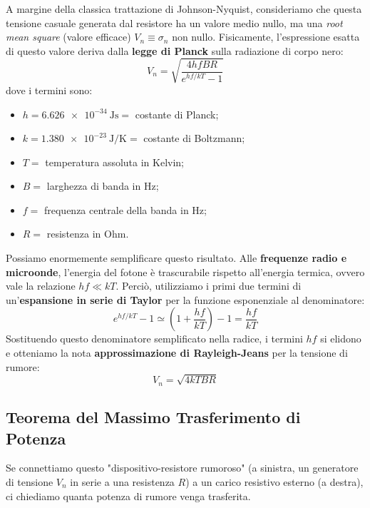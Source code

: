 \documentclass[openany,a4paper,12pt]{book}
\begin{document}
A margine della classica trattazione di Johnson-Nyquist, consideriamo che questa tensione casuale generata dal resistore ha un valore medio nullo, ma una \textit{root mean square} (valore efficace) $V_n \equiv \sigma_n$ non nullo. 
Fisicamente, l'espressione esatta di questo valore deriva dalla \textbf{legge di Planck} sulla radiazione di corpo nero:
\begin{equation}
    V_n = \sqrt{\frac{4hf BR}{e^{hf/kT} - 1}}
\end{equation}
dove i termini sono:
\begin{itemize}[label=\textcolor{PoliBlue}{\textbullet}]
    \item $h = \qty{6.626e-34}{\joule\second} =$ costante di Planck;
    \item $k = \qty{1.380e-23}{\joule\per\kelvin} =$ costante di Boltzmann;
    \item $T =$ temperatura assoluta in Kelvin;
    \item $B =$ larghezza di banda in Hz;
    \item $f =$ frequenza centrale della banda in Hz;
    \item $R =$ resistenza in Ohm.
\end{itemize}

Possiamo enormemente semplificare questo risultato. Alle \textbf{frequenze radio e microonde}, l'energia del fotone è trascurabile rispetto all'energia termica, ovvero vale la relazione $hf \ll kT$.
Perciò, utilizziamo i primi due termini di un'\textbf{espansione in serie di Taylor} per la funzione esponenziale al denominatore:
\begin{equation}
    e^{hf/kT} - 1 \simeq \left( 1 + \frac{hf}{kT} \right) - 1 = \frac{hf}{kT}
\end{equation}
Sostituendo questo denominatore semplificato nella radice, i termini $hf$ si elidono e otteniamo la nota \textbf{approssimazione di Rayleigh-Jeans} per la tensione di rumore:
\begin{equation}
    V_n = \sqrt{4kTBR}
\end{equation}

\subsection*{Teorema del Massimo Trasferimento di Potenza}

Se connettiamo questo "dispositivo-resistore rumoroso" (a sinistra, un generatore di tensione $V_n$ in serie a una resistenza $R$) a un carico resistivo esterno (a destra), ci chiediamo quanta potenza di rumore venga trasferita.
\end{document}
